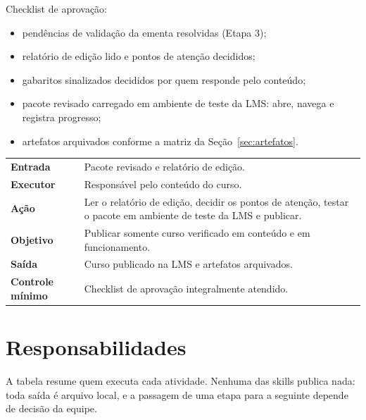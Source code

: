 \documentclass[12pt,a4paper]{article}
\makeatletter
\newcommand{\campo}[1]{\textcolor{azulinst}{\textbf{#1}}}
\newenvironment{ficha}
  {\begin{longtable}{@{}L{0.24\textwidth}L{0.72\textwidth}@{}}\toprule}
  {\bottomrule\end{longtable}}
\makeatother
\begin{document}
Checklist de aprovação:

\begin{itemize}[leftmargin=*]
\item pendências de validação da ementa resolvidas (Etapa 3);
\item relatório de edição lido e pontos de atenção decididos;
\item gabaritos sinalizados decididos por quem responde pelo conteúdo;
\item pacote revisado carregado em ambiente de teste da LMS: abre, navega e registra progresso;
\item artefatos arquivados conforme a matriz da Seção~\ref{sec:artefatos}.
\end{itemize}

\begin{ficha}
\campo{Entrada} & Pacote revisado e relatório de edição. \\ \addlinespace
\campo{Executor} & Responsável pelo conteúdo do curso. \\ \addlinespace
\campo{Ação} & Ler o relatório de edição, decidir os pontos de atenção, testar o pacote em ambiente de teste da LMS e publicar. \\ \addlinespace
\campo{Objetivo} & Publicar somente curso verificado em conteúdo e em funcionamento. \\ \addlinespace
\campo{Saída} & Curso publicado na LMS e artefatos arquivados. \\ \addlinespace
\campo{Controle mínimo} & Checklist de aprovação integralmente atendido. \\
\end{ficha}

\section{Responsabilidades}\label{sec:responsabilidades}

A tabela resume quem executa cada atividade. Nenhuma das skills publica nada: toda saída é arquivo local, e a passagem de uma etapa para a seguinte depende de decisão da equipe.
\end{document}

